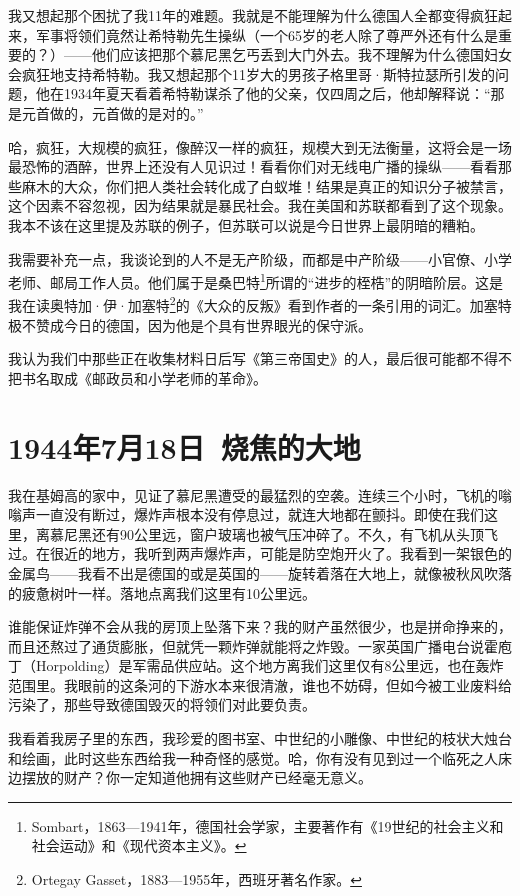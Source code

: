 \documentclass[UTF8]{ctexart}
\begin{document}
我又想起那个困扰了我11年的难题。我就是不能理解为什么德国人全都变得疯狂起来，军事将领们竟然让希特勒先生操纵（一个65岁的老人除了尊严外还有什么是重要的？）——他们应该把那个慕尼黑乞丐丢到大门外去。我不理解为什么德国妇女会疯狂地支持希特勒。我又想起那个11岁大的男孩子格里哥·斯特拉瑟所引发的问题，他在1934年夏天看着希特勒谋杀了他的父亲，仅四周之后，他却解释说：“那是元首做的，元首做的是对的。”

哈，疯狂，大规模的疯狂，像醉汉一样的疯狂，规模大到无法衡量，这将会是一场最恐怖的酒醉，世界上还没有人见识过！看看你们对无线电广播的操纵——看看那些麻木的大众，你们把人类社会转化成了白蚁堆！结果是真正的知识分子被禁言，这个因素不容忽视，因为结果就是暴民社会。我在美国和苏联都看到了这个现象。我本不该在这里提及苏联的例子，但苏联可以说是今日世界上最阴暗的糟粕。

我需要补充一点，我谈论到的人不是无产阶级，而都是中产阶级——小官僚、小学老师、邮局工作人员。他们属于是桑巴特\footnote{Sombart，1863—1941年，德国社会学家，主要著作有《19世纪的社会主义和社会运动》和《现代资本主义》。}所谓的“进步的桎梏”的阴暗阶层。这是我在读奥特加·伊·加塞特\footnote{Ortegay Gasset，1883—1955年，西班牙著名作家。}的《大众的反叛》看到作者的一条引用的词汇。加塞特极不赞成今日的德国，因为他是个具有世界眼光的保守派。

我认为我们中那些正在收集材料日后写《第三帝国史》的人，最后很可能都不得不把书名取成《邮政员和小学老师的革命》。

\section{1944年7月18日\ 烧焦的大地}

我在基姆高的家中，见证了慕尼黑遭受的最猛烈的空袭。连续三个小时，飞机的嗡嗡声一直没有断过，爆炸声根本没有停息过，就连大地都在颤抖。即使在我们这里，离慕尼黑还有90公里远，窗户玻璃也被气压冲碎了。不久，有飞机从头顶飞过。在很近的地方，我听到两声爆炸声，可能是防空炮开火了。我看到一架银色的金属鸟——我看不出是德国的或是英国的——旋转着落在大地上，就像被秋风吹落的疲惫树叶一样。落地点离我们这里有10公里远。

谁能保证炸弹不会从我的房顶上坠落下来？我的财产虽然很少，也是拼命挣来的，而且还熬过了通货膨胀，但就凭一颗炸弹就能将之炸毁。一家英国广播电台说霍庖丁（Horpolding）是军需品供应站。这个地方离我们这里仅有8公里远，也在轰炸范围里。我眼前的这条河的下游水本来很清澈，谁也不妨碍，但如今被工业废料给污染了，那些导致德国毁灭的将领们对此要负责。

我看着我房子里的东西，我珍爱的图书室、中世纪的小雕像、中世纪的枝状大烛台和绘画，此时这些东西给我一种奇怪的感觉。哈，你有没有见到过一个临死之人床边摆放的财产？你一定知道他拥有这些财产已经毫无意义。
\end{document}
